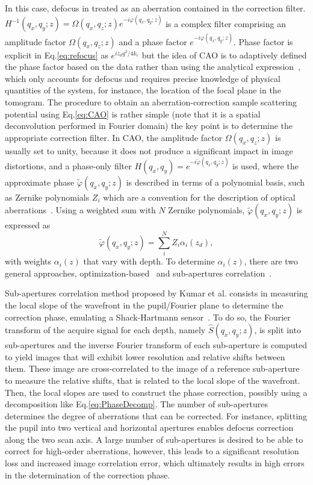 In this case, defocus in treated as an aberration contained in the correction filter. $H^{-1}(q_x, q_y; z) = \Omega(q_x,q_z;z) e^{-i\varphi(q_x, q_y; z)}$ is a complex filter comprising an amplitude factor $\Omega(q_x,q_z;z)$ and a phase factor $e^{-i\varphi(q_x, q_y; z)}$. Phase factor is explicit in Eq.\eqref{eq:refocus} as $e^{iz_dq^2/4k_c}$ but the idea of CAO is to adaptively defined the phase factor based on the data rather than using the analytical expression~\cite{Adie2012_Computational}, which only accounts for defocus and requires precise knowledge of physical quantities of the system, for instance, the location of the focal plane in the tomogram. The procedure to obtain an aberration-correction sample scattering potential using Eq.\eqref{eq:CAO} is rather simple (note that it is a spatial deconvolution performed in Fourier domain) the key point is to determine the appropriate correction filter. In CAO, the amplitude factor $\Omega(q_x,q_z;z)$ is usually set to unity, because it does not produce a significant impact in image distortions, and a phase-only filter $H(q_x,q_y)=e^{-i\tilde{\varphi}(q_x, q_y; z)}$ is used, where the approximate phase $\tilde{\varphi}(q_x, q_y; z)$ is described in terms of a polynomial basis, such as Zernike polynomials $Z_i$ which are a convention for the description of optical aberrations~\cite{Malacara2007_Optical, Lakshminarayanan2011_Zernike}. Using a weighted sum with $N$ Zernike polynomials, $\tilde{\varphi}(q_x, q_y; z)$ is expressed as
\begin{equation}\label{eq:PhaseDecomp}
	\tilde{\varphi}(q_x, q_y; z) = \sum_i^N Z_i\alpha_i(z_d),
\end{equation} 
with weights $\alpha_i(z)$ that vary with depth. To determine $\alpha_i(z)$, there are two general approaches, optimization-based~\cite{Adie2012_Computational} and sub-apertures correlation~\cite{Kumar2013_Subaperture}.

Sub-apertures correlation method proposed by Kumar et al. consists in measuring the local slope of the wavefront in the pupil/Fourier plane to determine the correction phase, emulating a Shack-Hartmann sensor~\cite{Kumar2013_Subaperture}. To do so, the Fourier transform of the acquire signal for each depth, namely $\hat{S}(q_x, q_y; z)$, is split into sub-apertures and the inverse Fourier transform of each sub-aperture is computed to yield images that will exhibit lower resolution and relative shifts between them. These image are cross-correlated to the image of a reference sub-aperture to measure the relative shifts, that is related to the local slope of the wavefront. Then, the local slopes are used to construct the phase correction, possibly using a decomposition like Eq.\eqref{eq:PhaseDecomp}. The number of sub-apertures determines the degree of aberrations that can be corrected. For instance, splitting the pupil into two vertical and horizontal apertures enables defocus correction along the two scan axis. A large number of sub-apertures is desired to be able to correct for high-order aberrations, however, this leads to a significant resolution loss and increased image correlation error, which ultimately results in high errors in the determination of the correction phase.

